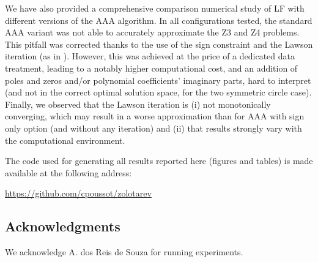 We have also provided a comprehensive comparison numerical study of LF with different versions of the AAA algorithm. In all configurations tested, the standard AAA variant was not able to accurately approximate the Z3 and Z4 problems. This pitfall was corrected thanks to the use of the sign constraint and the Lawson iteration (as in \cite{trefethen2024computation}). However, this was achieved at the price of a dedicated data treatment, leading to a notably higher computational cost, and an addition of poles and zeros and/or polynomial coefficients' imaginary parts, hard to interpret (and not in the correct optimal solution space, for the two symmetric circle case). Finally, we observed that the Lawson iteration is (i) not monotonically converging, which may result in a worse approximation than for AAA with sign only option (and without any iteration) and (ii) that results strongly vary with the computational environment. 

The code used for generating all results reported here (figures and tables) is made available at the following address:
\begin{center}
\url{https://github.com/cpoussot/zolotarev}
\end{center}

\subsection*{Acknowledgments}

We acknowledge A. dos Reis de Souza for running experiments.
